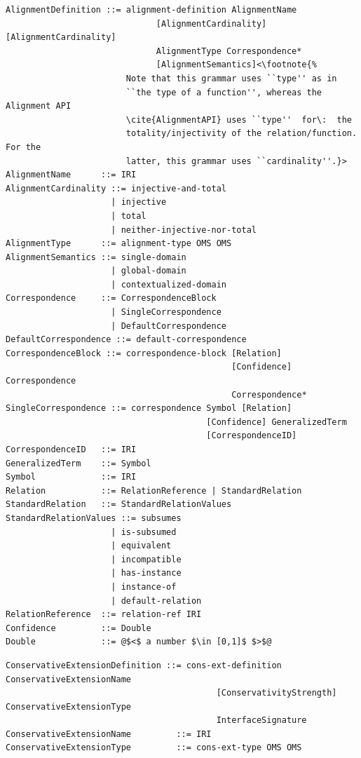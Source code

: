 \documentclass[10pt, a4paper]{isov2}
\begin{document}
\begin{lstlisting}[language=ebnf,escapeinside={@@},mathescape]  % abstract syntax
AlignmentDefinition ::= alignment-definition AlignmentName
                              [AlignmentCardinality] [AlignmentCardinality]
                              AlignmentType Correspondence*
                              [AlignmentSemantics]<\footnote{%
                        Note that this grammar uses ``type'' as in
                        ``the type of a function'', whereas the Alignment API
                        \cite{AlignmentAPI} uses ``type''  for\:  the
                        totality/injectivity of the relation/function.  For the
                        latter, this grammar uses ``cardinality''.}>
AlignmentName      ::= IRI
AlignmentCardinality ::= injective-and-total
                     | injective
                     | total
                     | neither-injective-nor-total
AlignmentType      ::= alignment-type OMS OMS
AlignmentSemantics ::= single-domain
                     | global-domain
                     | contextualized-domain
Correspondence     ::= CorrespondenceBlock
                     | SingleCorrespondence
                     | DefaultCorrespondence
DefaultCorrespondence ::= default-correspondence
CorrespondenceBlock ::= correspondence-block [Relation]
                                             [Confidence] Correspondence
                                             Correspondence*
SingleCorrespondence ::= correspondence Symbol [Relation]
                                        [Confidence] GeneralizedTerm
                                        [CorrespondenceID]
CorrespondenceID   ::= IRI
GeneralizedTerm    ::= Symbol
Symbol             ::= IRI
Relation           ::= RelationReference | StandardRelation
StandardRelation   ::= StandardRelationValues
StandardRelationValues ::= subsumes
                     | is-subsumed
                     | equivalent
                     | incompatible
                     | has-instance
                     | instance-of
                     | default-relation
RelationReference  ::= relation-ref IRI
Confidence         ::= Double
Double             ::= @$<$ a number $\in [0,1]$ $>$@ 
\end{lstlisting}

\begin{lstlisting}[language=ebnf,escapeinside={@@},mathescape]  % abstract syntax
ConservativeExtensionDefinition ::= cons-ext-definition ConservativeExtensionName
                                          [ConservativityStrength] ConservativeExtensionType
                                          InterfaceSignature
ConservativeExtensionName         ::= IRI
ConservativeExtensionType         ::= cons-ext-type OMS OMS
\end{lstlisting}
\end{document}
